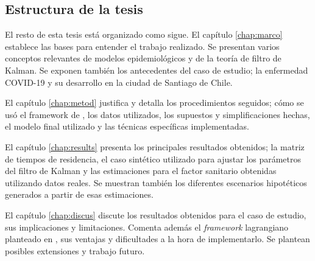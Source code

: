 \begin{intro}
\section*{Estructura de la tesis}
El resto de esta tesis está organizado como sigue. El capítulo \ref{chap:marco} establece las bases para entender el trabajo realizado. Se presentan varios conceptos relevantes de modelos epidemiológicos y de la teoría de filtro de Kalman. Se exponen también los antecedentes del caso de estudio; la enfermedad COVID-19 y su desarrollo en la ciudad de Santiago de Chile.

El capítulo \ref{chap:metod} justifica y detalla los procedimientos seguidos; cómo se usó el framework de \cite{Bichara2018}, los datos utilizados, los supuestos y simplificaciones hechas, el modelo final utilizado y las técnicas específicas implementadas.

El capítulo \ref{chap:results} presenta los principales resultados obtenidos; la matriz de tiempos de residencia, el caso sintético utilizado para ajustar los parámetros del filtro de Kalman y las estimaciones para el factor sanitario obtenidas utilizando datos reales. Se muestran también los diferentes escenarios hipotéticos generados a partir de esas estimaciones.

El capítulo \ref{chap:discus} discute los resultados obtenidos para el caso de estudio, sus implicaciones y limitaciones. Comenta además el  \textit{framework} lagrangiano planteado en \cite{Bichara2018}, sus ventajas y dificultades a la hora de implementarlo. Se plantean posibles extensiones y trabajo futuro.



\end{intro}

%
%




